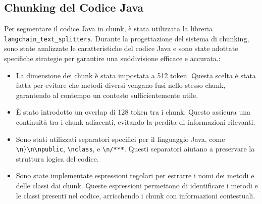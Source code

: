 \documentclass[12pt,a4paper,openright,twoside]{book}
\begin{document}
\subsection{Chunking del Codice Java}
Per segmentare il codice Java in chunk, è stata utilizzata la libreria \texttt{langchain\_text\_splitters}.
Durante la progettazione del sistema di chunking, sono state analizzate le caratteristiche del codice Java e sono state adottate specifiche strategie per garantire una suddivisione efficace e accurata.:
\begin{itemize}
    \item La dimensione dei chunk è stata impostata a 512 token. 
    Questa scelta è stata fatta per evitare che metodi diversi vengano fusi nello stesso chunk, garantendo al contempo un contesto sufficientemente utile.
    \item È stato introdotto un overlap di 128 token tra i chunk. Questo assicura una continuità tra i chunk adiacenti, evitando la perdita di informazioni rilevanti.
    \item Sono stati utilizzati separatori specifici per il linguaggio Java, come \texttt{\textbackslash n\}\textbackslash n\textbackslash npublic}, \texttt{\textbackslash nclass}, e \texttt{\textbackslash n/***}.
    Questi separatori aiutano a preservare la struttura logica del codice.
    \item Sono state implementate espressioni regolari per estrarre i nomi dei metodi e delle classi dai chunk.
    Queste espressioni permettono di identificare i metodi e le classi presenti nel codice, arricchendo i chunk con informazioni contestuali.
\end{itemize}
\newpage
\end{document}
